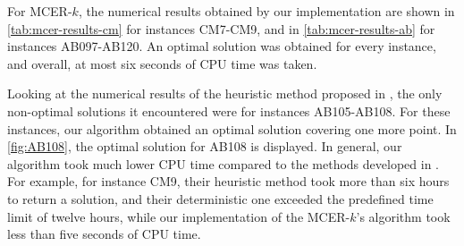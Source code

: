 For MCER-$k$, the numerical results obtained by our implementation are shown in \autoref{tab:mcer-results-cm} for instances CM7-CM9, and in \autoref{tab:mcer-results-ab} for instances AB097-AB120. 
An optimal solution was obtained for every instance, and overall, at most six seconds of CPU time was taken.

Looking at the numerical results of the heuristic method proposed in \cite{andreta}, the only non-optimal solutions it encountered were for instances AB105-AB108. For these instances, our algorithm obtained an optimal solution covering one more point. In \autoref{fig:AB108}, the optimal solution for AB108 is displayed.
In general, our algorithm took much lower CPU time compared to the methods developed in \cite{andreta}. For example, for instance CM9, their heuristic method took more than six hours to return a solution, and their deterministic one exceeded the predefined time limit of twelve hours, while our implementation of the MCER-$k$'s algorithm took less than five seconds of CPU time.

